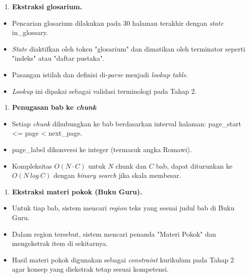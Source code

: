 \documentclass[
]{article}
\begin{document}
\begin{enumerate}
\def\labelenumi{\arabic{enumi}.}
\setcounter{enumi}{4}
\item
  \textbf{Ekstraksi glosarium.}
\end{enumerate}

\begin{itemize}
\item
  Pencarian glosarium dilakukan pada 30 halaman terakhir dengan
  \emph{state} in\_glossary.
\item
  \emph{State} diaktifkan oleh token "glosarium" dan dimatikan oleh
  terminator seperti "indeks" atau "daftar pustaka".
\item
  Pasangan istilah dan definisi di-\emph{parse} menjadi \emph{lookup
  table}.
\item
  \emph{Lookup} ini dipakai sebagai validasi terminologi pada Tahap 2.
\end{itemize}

\begin{enumerate}
\def\labelenumi{\arabic{enumi}.}
\setcounter{enumi}{5}
\item
  \textbf{Penugasan bab ke \emph{chunk}}
\end{enumerate}

\begin{itemize}
\item
  Setiap \emph{chunk} dihubungkan ke bab berdasarkan interval halaman:
  page\_start \textless= page \textless{} next\_page.
\item
  page\_label dikonversi ke integer (termasuk angka Romawi).
\item
  Kompleksitas \(O(N \cdot C)\) untuk \(N\) chunk dan \(C\) bab, dapat
  diturunkan ke \(O(N\ log\ C)\) dengan \emph{binary search} jika skala
  membesar.
\end{itemize}

\begin{enumerate}
\def\labelenumi{\arabic{enumi}.}
\setcounter{enumi}{6}
\item
  \textbf{Ekstraksi materi pokok (Buku Guru).}
\end{enumerate}

\begin{itemize}
\item
  Untuk tiap bab, sistem mencari \emph{region} teks yang sesuai judul
  bab di Buku Guru.
\item
  Dalam region tersebut, sistem mencari penanda "Materi Pokok" dan
  mengekstrak item di sekitarnya.
\item
  Hasil materi pokok digunakan sebagai \emph{constraint} kurikulum pada
  Tahap 2 agar konsep yang diekstrak tetap sesuai kompetensi.
\end{itemize}
\end{document}
